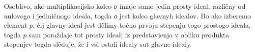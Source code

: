 \documentclass[11pt]{article}
\newcommand{\mo}{\mathfrak{o}}
\begin{document}
\setcounter{footnote}{33}

\noindent Osoblivo, ako multiplikacijsko kolco $\mo$ imaje samo jedin prosty ideal, različny od nulovogo i jediničnogo ideala, togda $\mo$ jest kolco glavnyh idealov. Bo ako izberemo element $p$, čij glavny ideal jest dělimy točno prvoju stepenju togo prostogo ideala, togda $p$ sam poraždaje tot prosty ideal; iz predstavjenja v obliku produkta stepenjev togda slěduje, že i vsi ostali idealy sut glavne idealy.
\end{document}
